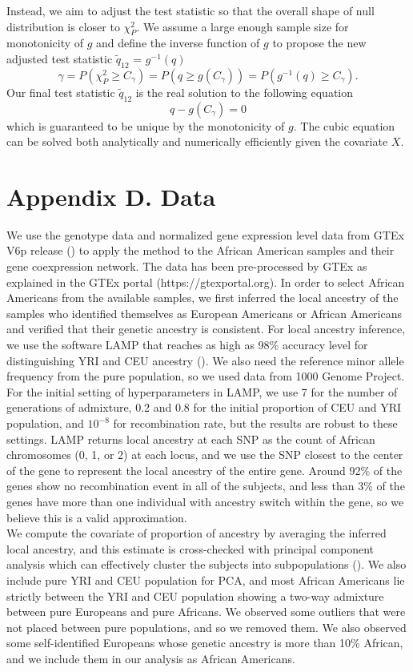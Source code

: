 \documentclass[aap,authoryear, preprint]{imsart}
\numberwithin{equation}{section}
\theoremstyle{plain}
\begin{document}
\vspace{5mm} 
Instead, we aim to adjust the test statistic so that the overall shape of null distribution is closer to $\chi_{P}^2$. We assume a large enough sample size for monotonicity of $g$ and define the inverse function of $g$ to propose the new adjusted test statistic $\tilde{q}_{12}$ = $g^{-1}(q)$
$$\gamma = P(\chi_{P}^2 \geq C_{\gamma}) = P(q \geq g(C_{\gamma})) = P(g^{-1}(q) \geq C_{\gamma}).$$
Our final test statistic $\tilde{q}_{12}$ is the real solution to the following equation 
$$q - g(C_{\gamma}) = 0$$
which is guaranteed to be unique by the monotonicity of $g$. The cubic equation can be solved both analytically and numerically efficiently given the covariate $X$. 

\section*{Appendix D. Data}
We use the genotype data and normalized gene expression level data from GTEx V6p release (\cite{lonsdale2013genotype}) to apply the method to the African American samples and their gene coexpression network. The data has been pre-processed by GTEx as explained in the GTEx portal (https://gtexportal.org). In order to select African Americans from the available samples, we first inferred the local ancestry of the samples who identified themselves as European Americans or African Americans and verified that their genetic ancestry is consistent. For local ancestry inference, we use the software LAMP that reaches as high as 98\% accuracy level for distinguishing YRI and CEU ancestry (\cite{pacsaniuc2009imputation}). We also need the reference minor allele frequency from the pure population, so we used data from 1000 Genome Project. For the initial setting of hyperparameters in LAMP, we use 7 for the number of generations of admixture, 0.2 and 0.8 for the initial proportion of CEU and YRI population, and $10^{-8}$ for recombination rate, but the results are robust to these settings. LAMP returns local ancestry at each SNP as the count of African chromosomes (0, 1, or 2) at each locus, and we use the SNP closest to the center of the gene to represent the local ancestry of the entire gene.  Around 92\% of the genes show no recombination event in all of the subjects, and less than 3\% of the genes have more than one individual with ancestry switch within the gene, so we believe this is a valid approximation. \\

We compute the covariate of proportion of ancestry by averaging the inferred local ancestry, and this estimate is cross-checked with principal component analysis which can effectively cluster the subjects into subpopulations (\cite{pritchard2000inference}). We also include pure YRI and CEU population for PCA, and most African Americans lie strictly between the YRI and CEU population showing a two-way admixture between pure Europeans and pure Africans. We observed some outliers that were not placed between pure populations, and so we removed them. We also observed some self-identified Europeans whose genetic ancestry is more than 10\% African, and we include them in our analysis as African Americans. \\
\end{document}
